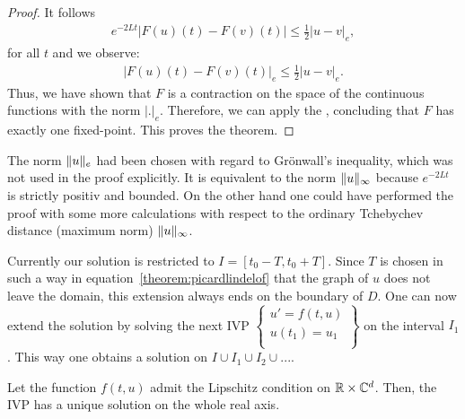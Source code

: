 \begin{proof}
  It follows   
  \begin{gather*}
    e^{-2 L t}|F(u)(t) - F(v)(t)| \le \frac12 |u-v|_e,
  \end{gather*}
  for all $t$ and we observe:
  \begin{gather*}
    |F(u)(t) - F(v)(t)|_e \le \frac12 |u-v|_e.
  \end{gather*}
  Thus, we have shown that $F$ is a contraction on the space of the
  continuous functions with the norm $|.|_e$.  Therefore, we can apply
  the , concluding that $F$ has
  exactly one fixed-point. This proves the theorem.
\end{proof}

\begin{remark}
  The norm $\lVert u\rVert_e$ had been chosen with regard to Grönwall's
  inequality, which was not used in the proof explicitly.  It is
  equivalent to the norm $\lVert u\rVert_\infty$ because $e^{-2 L t}$ is strictly
  positiv and bounded. On the other hand one could have performed the
  proof with some more calculations with respect to the ordinary
  Tchebychev distance (maximum norm) $\lVert u\rVert_\infty$.
\end{remark}

\begin{remark}
  Currently our solution is restricted to $I = [t_0 - T, t_0 + T]$.
  Since $T$ is chosen in such a way in
  equation~\ref{theorem:picardlindelof} that the graph of $u$ does not
  leave the domain, this extension always ends on the boundary of
  $D$. One can now extend the solution by solving the next IVP
  $\left\{\begin{array}{l}
            u' = f(t,u)\\
            u(t_1) = u_1\\
  \end{array}\right\}$
	on the interval $I_1$. This way one obtains a solution on
 $I \cup I_1 \cup I_2 \cup ...$.
\end{remark}

\begin{corollary}
  Let the function $f(t,u)$ admit the Lipschitz condition on $\mathbb R\times
  \mathbb C^d$. Then, the IVP has a unique solution on the whole real axis.
\end{corollary}

